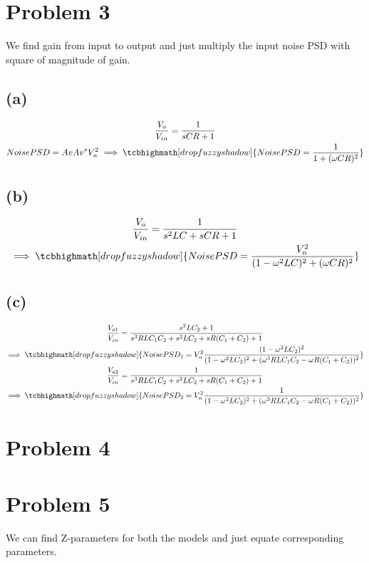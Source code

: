 \documentclass{article}
\begin{document}
\section*{\hfil Problem 3}
We find gain from input to output and just multiply the input noise PSD with square of magnitude of gain.
\subsection*{(a)}
\begin{gather*}
	\frac{V_o}{V_{in}} = \frac{1}{sCR + 1}\\
	Noise PSD = AvAv^*V_n^2
	\implies \tcbhighmath[drop fuzzy shadow]{NoisePSD = \frac{1}{1 + (\omega CR)^2}}
\end{gather*}
\subsection*{(b)}
\begin{gather*}
	\frac{V_o}{V_{in}} = \frac{1}{s^2LC + sCR + 1}\\
	\implies \tcbhighmath[drop fuzzy shadow]{NoisePSD = \frac{V_n^2}{(1 - {\omega}^2 LC)^2 + (\omega CR)^2}}
\end{gather*}
\subsection*{(c)}
\begin{gather*}
	\frac{V_{o1}}{V_{in}} = \frac{s^2LC_2 + 1}{s^3RLC_1C_2 + s^2LC_2 + sR(C_1 + C_2) + 1}\\
	\implies \tcbhighmath[drop fuzzy shadow]{NoisePSD_1 = V_n^2\frac{(1 - {\omega}^2LC_2)^2}{(1 - {\omega}^2LC_2)^2 + ({\omega}^3RLC_1C_2 - {\omega}R(C_1 + C_2))^2}}\\
	\frac{V_{o2}}{V_{in}} = \frac{1}{s^3RLC_1C_2 + s^2LC_2 + sR(C_1 + C_2) + 1}\\
	\implies \tcbhighmath[drop fuzzy shadow]{NoisePSD_2 = V_n^2\frac{1}{(1 - {\omega}^2LC_2)^2 + ({\omega}^3RLC_1C_2 - {\omega}R(C_1 + C_2))^2}}\\
\end{gather*}
\section*{\hfil Problem 4}

\section*{\hfil Problem 5}
We can find Z-parameters for both the models and just equate corresponding parameters.
\end{document}
